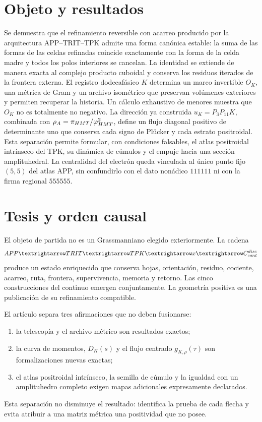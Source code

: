


\section*{Objeto y resultados}
Se demuestra que el refinamiento reversible con acarreo producido por la
arquitectura APP--TRIT--TPK admite una forma canónica estable: la suma de las
formas de las celdas refinadas coincide exactamente con la forma de la celda
madre y todos los polos interiores se cancelan. La identidad se extiende de
manera exacta al complejo producto cuboidal y conserva los residuos iterados de
la frontera externa. El registro dodecafásico \(K\) determina un marco
invertible \(O_K\), una métrica de Gram y un archivo isométrico que preservan
volúmenes exteriores y permiten recuperar la historia. Un cálculo exhaustivo
de menores muestra que \(O_K\) no es totalmente no negativo. La dirección
ya construida \(u_K=P_3P_{11}K\), combinada con
\(\rho_A=\pi_{\rm HMT}/\varphi_{\rm HMT}^2\), define un flujo diagonal
positivo de determinante uno que conserva cada signo de Plücker y cada
estrato positroidal. Esta separación permite formular, con
condiciones falsables, el atlas positroidal intrínseco del TPK, su dinámica de
cúmulos y el empuje hacia una sección amplituhedral. La centralidad del
electrón queda vinculada al único punto fijo \((5,5)\) del atlas APP, sin
confundirlo con el dato nonádico \(111111\) ni con la firma regional
\(555555\).


\section{Tesis y orden causal}

El objeto de partida no es un Grassmanniano elegido exteriormente. La cadena
\[
\APP\longrightarrow\mathrm{TRIT}\longrightarrow\TPK
\longrightarrow\widehat x
\longrightarrow\mathcal C_{\rm cont}^{\rm disc}
\]
produce un estado enriquecido que conserva hojas, orientación, residuo,
cociente, acarreo, ruta, frontera, supervivencia, memoria y retorno. Las cinco
construcciones del continuo emergen conjuntamente. La geometría positiva es
una publicación de su refinamiento compatible.

El artículo separa tres afirmaciones que no deben fusionarse:
\begin{enumerate}
\item la telescopía y el archivo métrico son resultados exactos;
\item la curva de momentos, \(D_K(s)\) y el flujo centrado
      \(g_{K,\rho}(\tau)\) son formalizaciones nuevas exactas;
\item el atlas positroidal intrínseco, la semilla de cúmulo y la igualdad con
un amplituhedro completo exigen mapas adicionales expresamente declarados.
\end{enumerate}
Esta separación no disminuye el resultado: identifica la prueba de cada flecha
y evita atribuir a una matriz métrica una positividad que no posee.

